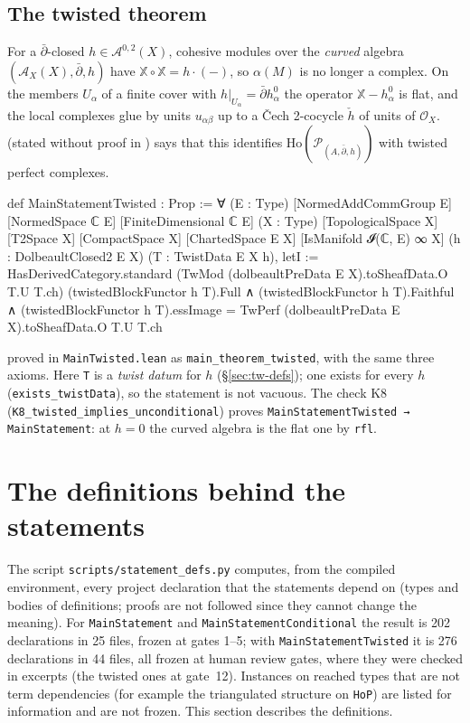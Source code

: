 \documentclass[11pt,a4paper]{article}
\newcommand{\code}[1]{\texttt{#1}}
\newcommand{\cA}{\mathcal{A}}
\newcommand{\Ocal}{\mathcal{O}}
\newcommand{\dbar}{\bar\partial}
\newcommand{\Ho}{\mathrm{Ho}}
\newcommand{\X}{\mathbb{X}}
\newcommand{\hc}{\check h}
\begin{document}
\subsection{The twisted theorem}\label{sec:tw-statement}
For a $\dbar$-closed $h\in\cA^{0,2}(X)$, cohesive modules over the \emph{curved} algebra
$(\cA_X(X),\dbar,h)$ have $\X\circ\X=h\cdot(-)$, so $\alpha(M)$ is no longer a complex. On the
members $U_\alpha$ of a finite cover with $h|_{U_\alpha}=\dbar h^0_\alpha$ the operator
$\X-h^0_\alpha$ is flat, and the local complexes glue by units $u_{\alpha\beta}$ up to a Čech
2-cocycle $\hc$ of units of $\Ocal_X$. \cite[Thm~7.4.3]{A} (stated without proof in \cite[Thm~4.2.1]{B})
says that this identifies $\Ho(\mathcal P_{(A,\dbar,h)})$ with twisted perfect complexes.
\begin{lean}
def MainStatementTwisted : Prop :=
  ∀ (E : Type) [NormedAddCommGroup E] [NormedSpace ℂ E] [FiniteDimensional ℂ E]
    (X : Type) [TopologicalSpace X] [T2Space X] [CompactSpace X]
    [ChartedSpace E X] [IsManifold 𝓘(ℂ, E) ∞ X]
    (h : DolbeaultClosed2 E X) (T : TwistData E X h),
      letI := HasDerivedCategory.standard (TwMod (dolbeaultPreData E X).toSheafData.O T.U T.ch)
      (twistedBlockFunctor h T).Full ∧ (twistedBlockFunctor h T).Faithful ∧
        (twistedBlockFunctor h T).essImage = TwPerf (dolbeaultPreData E X).toSheafData.O T.U T.ch
\end{lean}
proved in \code{MainTwisted.lean} as \code{main\_theorem\_twisted}, with the same three axioms.
Here \code{T} is a \emph{twist datum} for $h$ (\S\ref{sec:tw-defs}); one exists for every $h$
(\code{exists\_twistData}), so the statement is not vacuous. The check K8
(\code{K8\_twisted\_implies\_unconditional}) proves \code{MainStatementTwisted → MainStatement}:
at $h=0$ the curved algebra is the flat one by \code{rfl}.

\section{The definitions behind the statements}
The script \code{scripts/statement\_defs.py} computes, from the compiled environment, every
project declaration that the statements depend on (types and bodies of definitions; proofs are
not followed since they cannot change the meaning). For \code{MainStatement} and
\code{MainStatementConditional} the result is 202 declarations in 25 files, frozen at gates 1--5;
with \code{MainStatementTwisted} it is 276 declarations in 44 files, all frozen at human review gates,
where they were checked in excerpts (the twisted ones at gate~12). Instances on reached types that are not term dependencies (for
example the triangulated structure on \code{HoP}) are listed for information and are not frozen.
This section describes the definitions.
\end{document}
